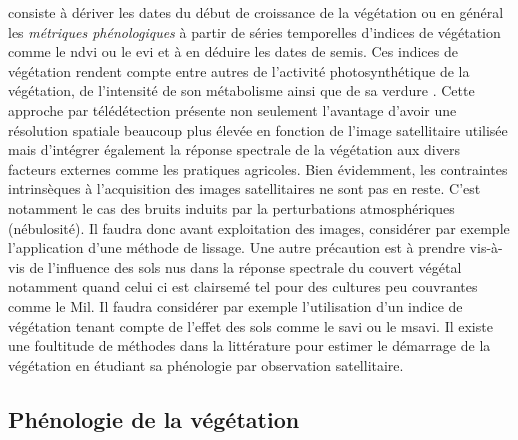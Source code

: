 consiste à dériver les dates du début de croissance de la végétation ou en général les \emph{métriques phénologiques} à partir de séries temporelles d'indices de végétation comme le \acrshort{ndvi} ou le \acrshort{evi} 
et à en déduire les dates de semis. Ces indices de végétation rendent compte entre autres de l’activité photosynthétique de la
végétation, de l’intensité de son métabolisme ainsi que de sa verdure \citep{Duarte2018}. Cette approche par télédétection présente non seulement l'avantage d'avoir une résolution 
spatiale beaucoup plus élevée en fonction de l'image 
satellitaire utilisée mais d'intégrer également la réponse spectrale de la végétation aux divers facteurs externes comme les pratiques agricoles. Bien évidemment, les contraintes intrinsèques à
l'acquisition des images satellitaires ne sont pas en reste. C'est notamment le cas des bruits induits par la perturbations atmosphériques (nébulosité). Il faudra donc avant exploitation des images, considérer 
par exemple l'application d'une méthode de lissage. Une autre précaution est à prendre vis-à-vis de l'influence des sols nus dans la réponse spectrale du couvert végétal 
notamment quand celui ci est clairsemé tel pour des cultures peu couvrantes comme le Mil. Il faudra considérer par exemple l'utilisation d'un indice de végétation tenant compte de l'effet des sols comme le \acrshort{savi} ou le 
\acrshort{msavi}. Il existe une foultitude de méthodes dans la littérature pour estimer le démarrage de la végétation en étudiant sa phénologie par observation satellitaire. 
  
  \subsection{Phénologie de la végétation}
  
